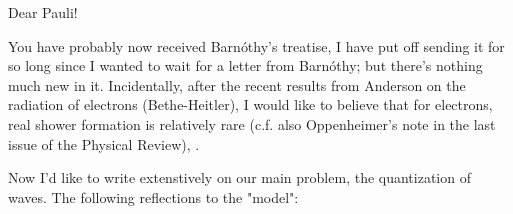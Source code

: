 \date{January 16, 1936}


Dear Pauli!

You have probably now received Barn\'othy's treatise, I have put off sending it for so long since I wanted to wait for a letter from Barn\'othy; but there's nothing much new in it. Incidentally, after the recent results from Anderson on the radiation of electrons (Bethe-Heitler), I would like to believe that for electrons, real shower formation is relatively rare (c.f. also Oppenheimer's note in the last issue of the Physical Review), .

Now I'd like to write extenstively on our main problem, the quantization of waves. The following reflections  to the "model":

